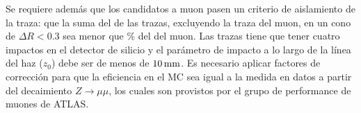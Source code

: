 
Se requiere además que los candidatos a muon pasen un criterio de aislamiento de
la traza: que la suma del {\pt} de las trazas, excluyendo la traza del muon, en
un cono de $\Delta R < 0.3$ sea menor que \unit[12]{\%} del {\pt} del muon. Las
trazas tiene que tener cuatro impactos en el detector de silicio y el parámetro
de impacto a lo largo de la línea del haz ($z_{0}$) debe ser de menos de
$\unit[10]{mm}$.
Es necesario aplicar factores de corrección para que la eficiencia en el MC
sea igual a la medida en datos a partir del decaimiento $Z\to\mu\mu$, los
cuales son provistos por el grupo de performance de muones de ATLAS.



